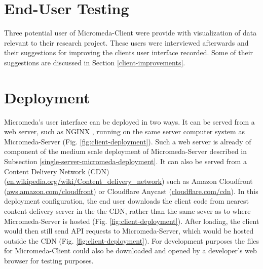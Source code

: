 \section{End-User Testing}

Three potential user of Micromeda-Client were provide with visualization of data relevant to their research project. These users were interviewed afterwards and their suggestions for improving the clients user interface recorded. Some of their suggestions are discussed in Section \ref{client-improvements}. 

\section{Deployment}

Micromeda's user interface can be deployed in two ways. It can be served from a web server, such as NGINX \cite{reese2008nginx}, running on the same server computer system as Micromeda-Server (Fig. \ref{fig:client-deployment}). Such a web server is already of component of the medium scale deployment of Micromeda-Server described in Subsection \ref{single-server-micromeda-deployment}. It can also be served from a Content Delivery Network (CDN) \cite{farber2003internet} (\href{en.wikipedia.org/wiki/Content\_delivery\_network}{en.wikipedia.org/wiki/Content\_delivery\_network}) such as Amazon Cloudfront \cite{varia2014overview} (\href{aws.amazon.com/cloudfront}{aws.amazon.com/cloudfront}) or Cloudflare Anycast \cite{calder2015analyzing} (\href{cloudflare.com/cdn}{cloudflare.com/cdn}). In this deployment configuration, the end user downloads the client code from nearest content delivery server in the the CDN, rather than the same sever as to where Micromeda-Server is hosted (Fig. \ref{fig:client-deployment}). After loading, the client would then still send API requests to Micromeda-Server, which would be hosted outside the CDN (Fig. \ref{fig:client-deployment}). For development purposes the files for Micromeda-Client could also be downloaded and opened by a developer's web browser for testing purposes.

